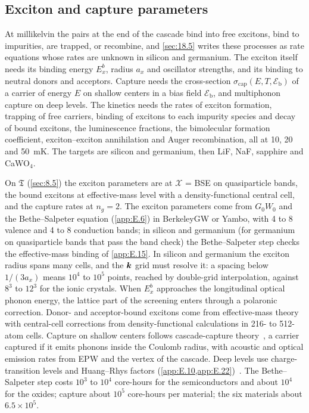 \subsection{Exciton and capture parameters}

At millikelvin the pairs at the end of the cascade bind into free excitons, bind to impurities, are trapped, or recombine, and \cref{sec:18.5} writes these processes as rate equations whose rates are unknown in silicon and germanium. The exciton itself needs its binding energy $E_x^b$, radius $a_x$ and oscillator strengths, and its binding to neutral donors and acceptors. Capture needs the cross-section $\sigma_{\mathrm{cap}}(E, T, \mathcal{E}_{\mathrm{b}})$ of a carrier of energy $E$ on shallow centers in a bias field $\mathcal{E}_{\mathrm{b}}$, and multiphonon capture on deep levels. The kinetics needs the rates of exciton formation, trapping of free carriers, binding of excitons to each impurity species and decay of bound excitons, the luminescence fractions, the bimolecular formation coefficient, exciton--exciton annihilation and Auger recombination, all at 10, 20 and \SI{50}{mK}. The targets are silicon and germanium, then LiF, NaF, sapphire and CaWO$_4$.

On $\mathfrak{T}$ (\cref{sec:8.5}) the exciton parameters are at $\mathcal{X}$ = BSE on quasiparticle bands, the bound excitons at effective-mass level with a density-functional central cell, and the capture rates at $n_g = 2$. The exciton parameters come from $G_0W_0$ and the Bethe--Salpeter equation (\cref{app:E.6}) in BerkeleyGW or Yambo, with 4 to 8 valence and 4 to 8 conduction bands; in silicon and germanium (for germanium on quasiparticle bands that pass the band check) the Bethe--Salpeter step checks the effective-mass binding of \cref{app:E.15}. In silicon and germanium the exciton radius spans many cells, and the $\bm{k}$ grid must resolve it: a spacing below $1/(3a_x)$ means $10^4$ to $10^5$ points, reached by double-grid interpolation, against $8^3$ to $12^3$ for the ionic crystals. When $E_x^b$ approaches the longitudinal optical phonon energy, the lattice part of the screening enters through a polaronic correction. Donor- and acceptor-bound excitons come from effective-mass theory with central-cell corrections from density-functional calculations in 216- to 512-atom cells. Capture on shallow centers follows cascade-capture theory~\cite{lax1960cascade}, a carrier captured if it emits phonons inside the Coulomb radius, with acoustic and optical emission rates from EPW and the vertex of the cascade. Deep levels use charge-transition levels and Huang--Rhys factors (\cref{app:E.10,app:E.22})~\cite{alkauskas2014first}. The Bethe--Salpeter step costs $10^3$ to $10^4$ core-hours for the semiconductors and about $10^4$ for the oxides; capture about $10^5$ core-hours per material; the six materials about $6.5\times10^5$.

